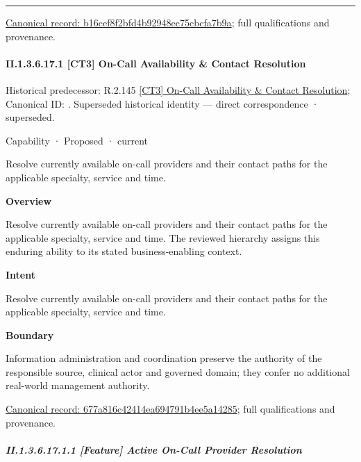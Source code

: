 \medskip\hrule\medskip

{\footnotesize \href{../../../../continuum/strategy/capability/b16cef8f2bfd4b92948ec75cbcfa7b9a.md}{Canonical record: b16cef8f2bfd4b92948ec75cbcfa7b9a}; full qualifications and provenance.}\par
\paragraph*{II.1.3.6.17.1 [CT3] On-Call Availability \& Contact Resolution}
\label{navigation:II.1.3.6.17.1}

{\small Historical predecessor: R.2.145 \hyperref[element:a03075a46f75497f8c6ba95d9c9e27c4]{[CT3] On-Call Availability \& Contact Resolution}; Canonical ID: \texttt{}. Superseded historical identity — direct correspondence · superseded.}\par
\label{element:677a816c42414ea694791b4ee5a14285}
{\small Capability · Proposed · current}\par

Resolve currently available on-call providers and their contact paths for the applicable specialty, service and time.



\textbf{Overview}



Resolve currently available on-call providers and their contact paths for the applicable specialty, service and time. The reviewed hierarchy assigns this enduring ability to its stated business-enabling context.



\textbf{Intent}



Resolve currently available on-call providers and their contact paths for the applicable specialty, service and time.



\textbf{Boundary}



Information administration and coordination preserve the authority of the responsible source, clinical actor and governed domain; they confer no additional real-world management authority.


{\footnotesize \href{../../../../continuum/strategy/capability/677a816c42414ea694791b4ee5a14285.md}{Canonical record: 677a816c42414ea694791b4ee5a14285}; full qualifications and provenance.}\par
\subparagraph*{II.1.3.6.17.1.1 [Feature] Active On-Call Provider Resolution}
\label{navigation:II.1.3.6.17.1.1}

